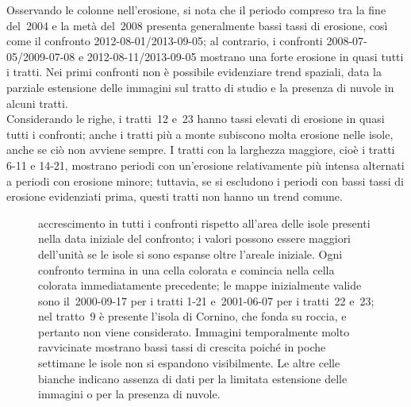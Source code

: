 Osservando le colonne nell'erosione, si nota che il periodo compreso tra la fine del~2004 e la metà del~2008 presenta generalmente bassi tassi di erosione, così come il confronto 2012-08-01/2013-09-05;
al contrario, i confronti 2008-07-05/2009-07-08 e 2012-08-11/2013-09-05 mostrano una forte erosione in quasi tutti i tratti.
Nei primi confronti non è possibile evidenziare trend spaziali, data la parziale estensione delle immagini sul tratto di studio e la presenza di nuvole in alcuni tratti.
\\
Considerando le righe, i tratti~12 e~23 hanno tassi elevati di erosione in quasi tutti i confronti; anche i tratti più a monte subiscono molta erosione nelle isole, anche se ciò non avviene sempre.
I tratti con la larghezza maggiore, cioè i tratti 6-11 e 14-21, mostrano periodi con un'erosione relativamente più intensa alternati a periodi con erosione minore; tuttavia, se si escludono i periodi con bassi tassi di erosione evidenziati prima, questi tratti non hanno un trend comune.
%
\begin{figure}
	\centering
	
	\caption[accrescimento in tutti i confronti rispetto all'area delle isole presenti inizialmente]{accrescimento in tutti i confronti rispetto all'area delle isole presenti nella data iniziale del confronto; i valori possono essere maggiori dell'unità se le isole si sono espanse oltre l'areale iniziale.
	Ogni confronto termina in una cella colorata e comincia nella cella colorata immediatamente precedente; le mappe inizialmente valide sono il~2000-09-17 per i tratti 1-21 e~2001-06-07 per i tratti~22 e~23; nel tratto~9 è presente l'isola di Cornino, che fonda su roccia, e pertanto non viene considerato.
	Immagini temporalmente molto ravvicinate mostrano bassi tassi di crescita poiché in poche settimane le isole non si espandono visibilmente.
	Le altre celle bianche indicano assenza di dati per la limitata estensione delle immagini o per la presenza di nuvole.}
	\label{graph:accrescimento-matrix}
\end{figure}
%

